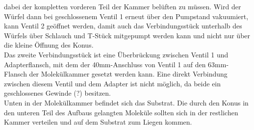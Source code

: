 dabei der kompletten vorderen Teil der Kammer belüften zu müssen. Wird der Würfel dann bei geschlossenem
Ventil 1 erneut über den Pumpstand vakuumiert, kann Ventil 2 geöffnet werden, damit auch das Verbindungsstück
unterhalb des Würfels über Schlauch und T-Stück mitgepumpt werden kann und nicht nur über die kleine Öffnung
des Konus.\\
Das zweite Verbindungsstück ist eine Überbrückung zwischen Ventil 1 und Adapterflansch, mit dem
der 40mm-Anschluss von Ventil 1 %
auf den 63mm-Flansch der Molekülkammer gesetzt werden kann. Eine direkt Verbindung zwischen diesem
Ventil und dem Adapter ist nicht möglich, da beide ein geschlossenes Gewinde (?) besitzen.\\
Unten in der Molekülkammer befindet sich das Substrat. Die durch den Konus in den unteren Teil des Aufbaus
gelangten Moleküle sollten sich in der restlichen Kammer verteilen und auf dem Substrat zum Liegen kommen.




